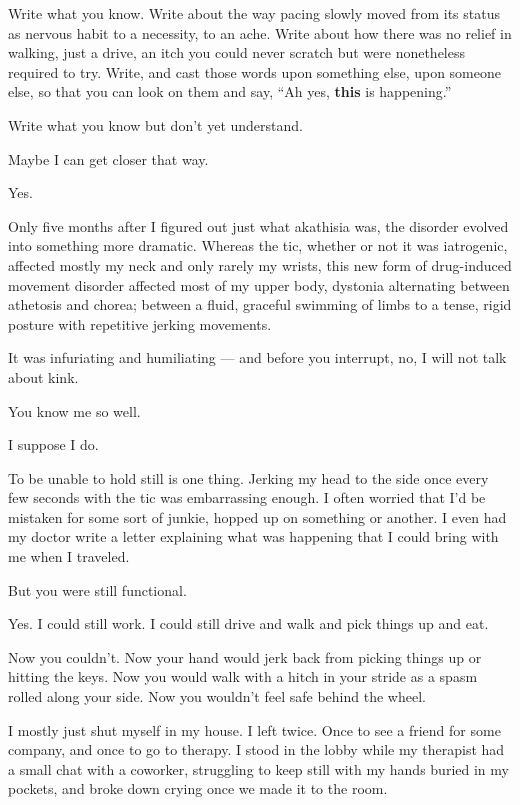 \begin{paracol}{2}
\begin{leftcolumn}
\begin{ally}
Write what you know. Write about the way pacing slowly moved from its status as nervous habit to a necessity, to an ache. Write about how there was no relief in walking, just a drive, an itch you could never scratch but were nonetheless required to try. Write, and cast those words upon something else, upon someone else, so that you can look on them and say, ``Ah yes, \textbf{this} is happening.''
\end{ally}
\begin{ally}
Write what you know but don't yet understand.
\end{ally}
Maybe I can get closer that way.

\begin{ally}
Yes.
\end{ally}
\newpage

\noindent Only five months after I figured out just what akathisia was, the disorder evolved into something more dramatic. Whereas the tic, whether or not it was iatrogenic, affected mostly my neck and only rarely my wrists, this new form of drug-induced movement disorder affected most of my upper body, dystonia alternating between athetosis and chorea; between a fluid, graceful swimming of limbs to a tense, rigid posture with repetitive jerking movements.

It was infuriating and humiliating --- and before you interrupt, no, I will not talk about kink.

\begin{ally}
You know me so well.
\end{ally}
I suppose I do.

To be unable to hold still is one thing. Jerking my head to the side once every few seconds with the tic was embarrassing enough. I often worried that I'd be mistaken for some sort of junkie, hopped up on something or another. I even had my doctor write a letter explaining what was happening that I could bring with me when I traveled.

\begin{ally}
But you were still functional.
\end{ally}
Yes. I could still work. I could still drive and walk and pick things up and eat.

\begin{ally}
Now you couldn't. Now your hand would jerk back from picking things up or hitting the keys. Now you would walk with a hitch in your stride as a spasm rolled along your side. Now you wouldn't feel safe behind the wheel.
\end{ally}
I mostly just shut myself in my house. I left twice. Once to see a friend for some company, and once to go to therapy. I stood in the lobby while my therapist had a small chat with a coworker, struggling to keep still with my hands buried in my pockets, and broke down crying once we made it to the room.


\end{leftcolumn}
\end{paracol}
